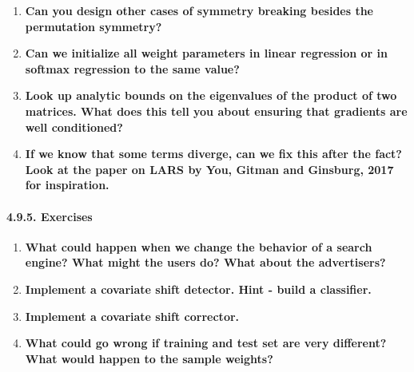 \documentclass[11pt]{article}
\begin{document}
\begin{enumerate}
\def\labelenumi{\arabic{enumi}.}
\item
  \textbf{Can you design other cases of symmetry breaking besides the
  permutation symmetry?}
\item
  \textbf{Can we initialize all weight parameters in linear regression
  or in softmax regression to the same value?}
\item
  \textbf{Look up analytic bounds on the eigenvalues of the product of
  two matrices. What does this tell you about ensuring that gradients
  are well conditioned?}
\item
  \textbf{If we know that some terms diverge, can we fix this after the
  fact? Look at the paper on LARS by You, Gitman and Ginsburg, 2017 for
  inspiration.}
\end{enumerate}

    \paragraph{4.9.5. Exercises}\label{exercises}

\begin{enumerate}
\def\labelenumi{\arabic{enumi}.}
\item
  \textbf{What could happen when we change the behavior of a search
  engine? What might the users do? What about the advertisers?}
\item
  \textbf{Implement a covariate shift detector. Hint - build a
  classifier.}
\item
  \textbf{Implement a covariate shift corrector.}
\item
  \textbf{What could go wrong if training and test set are very
  different? What would happen to the sample weights?}
\end{enumerate}


    
    
    
    
\end{document}
